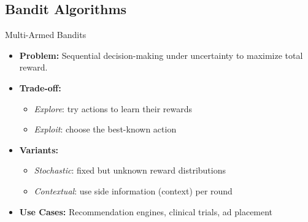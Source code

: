 \documentclass{beamer}
\begin{document}
\subsection{Bandit Algorithms}
\begin{frame}{Multi-Armed Bandits}
  \begin{itemize}
    \item \textbf{Problem:} Sequential decision-making under uncertainty to maximize total reward.
    \item \textbf{Trade-off:}
          \begin{itemize}
            \item \emph{Explore}: try actions to learn their rewards
            \item \emph{Exploit}: choose the best-known action
          \end{itemize}
    \item \textbf{Variants:}
          \begin{itemize}
            \item \emph{Stochastic}: fixed but unknown reward distributions
            \item \emph{Contextual}: use side information (context) per round
          \end{itemize}
    \item \textbf{Use Cases:}
          Recommendation engines, clinical trials, ad placement
  \end{itemize}
\end{frame}



\end{document}
